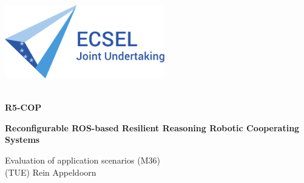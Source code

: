 

\thispagestyle{empty}

%
\label{sec:title}
\vspace{-7ex}

\includegraphics[height=3.2cm]{pics/ecsel-logo}\\[1cm]

\noindent\makebox[\textwidth]{\rule{\textwidth}{2pt}}

{\flushright
~\\[0cm]
	{\bf R5-COP\\[1cm]}

	{\bf Reconfigurable ROS-based Resilient Reasoning Robotic Cooperating Systems\\[2.0cm]}

  { Evaluation of application scenarios (M36)\\[1cm]}
	{(TUE) Rein Appeldoorn\\}
}

\vfill


